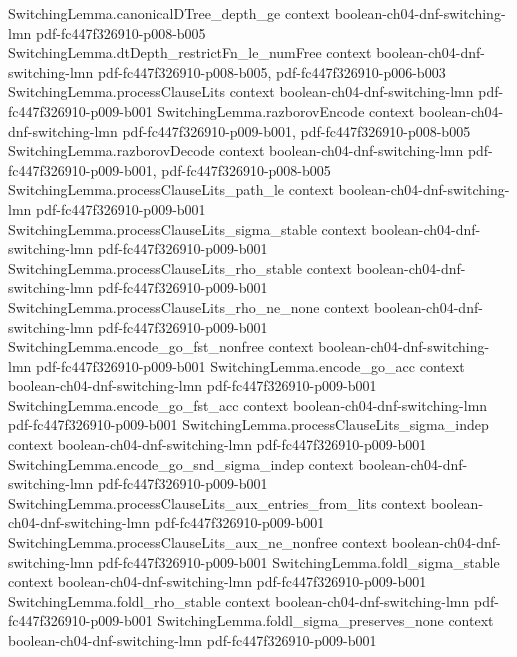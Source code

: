 \begin{theorem}
\proofstep
  {SwitchingLemma.canonicalDTree_depth_ge}
  {context}
  {boolean-ch04-dnf-switching-lmn}
  {pdf-fc447f326910-p008-b005}
\proofstep
  {SwitchingLemma.dtDepth_restrictFn_le_numFree}
  {context}
  {boolean-ch04-dnf-switching-lmn}
  {pdf-fc447f326910-p008-b005,
    pdf-fc447f326910-p006-b003}
\proofstep
  {SwitchingLemma.processClauseLits}
  {context}
  {boolean-ch04-dnf-switching-lmn}
  {pdf-fc447f326910-p009-b001}
\proofstep
  {SwitchingLemma.razborovEncode}
  {context}
  {boolean-ch04-dnf-switching-lmn}
  {pdf-fc447f326910-p009-b001,
    pdf-fc447f326910-p008-b005}
\proofstep
  {SwitchingLemma.razborovDecode}
  {context}
  {boolean-ch04-dnf-switching-lmn}
  {pdf-fc447f326910-p009-b001,
    pdf-fc447f326910-p008-b005}
\proofstep
  {SwitchingLemma.processClauseLits_path_le}
  {context}
  {boolean-ch04-dnf-switching-lmn}
  {pdf-fc447f326910-p009-b001}
\proofstep
  {SwitchingLemma.processClauseLits_sigma_stable}
  {context}
  {boolean-ch04-dnf-switching-lmn}
  {pdf-fc447f326910-p009-b001}
\proofstep
  {SwitchingLemma.processClauseLits_rho_stable}
  {context}
  {boolean-ch04-dnf-switching-lmn}
  {pdf-fc447f326910-p009-b001}
\proofstep
  {SwitchingLemma.processClauseLits_rho_ne_none}
  {context}
  {boolean-ch04-dnf-switching-lmn}
  {pdf-fc447f326910-p009-b001}
\proofstep
  {SwitchingLemma.encode_go_fst_nonfree}
  {context}
  {boolean-ch04-dnf-switching-lmn}
  {pdf-fc447f326910-p009-b001}
\proofstep
  {SwitchingLemma.encode_go_acc}
  {context}
  {boolean-ch04-dnf-switching-lmn}
  {pdf-fc447f326910-p009-b001}
\proofstep
  {SwitchingLemma.encode_go_fst_acc}
  {context}
  {boolean-ch04-dnf-switching-lmn}
  {pdf-fc447f326910-p009-b001}
\proofstep
  {SwitchingLemma.processClauseLits_sigma_indep}
  {context}
  {boolean-ch04-dnf-switching-lmn}
  {pdf-fc447f326910-p009-b001}
\proofstep
  {SwitchingLemma.encode_go_snd_sigma_indep}
  {context}
  {boolean-ch04-dnf-switching-lmn}
  {pdf-fc447f326910-p009-b001}
\proofstep
  {SwitchingLemma.processClauseLits_aux_entries_from_lits}
  {context}
  {boolean-ch04-dnf-switching-lmn}
  {pdf-fc447f326910-p009-b001}
\proofstep
  {SwitchingLemma.processClauseLits_aux_ne_nonfree}
  {context}
  {boolean-ch04-dnf-switching-lmn}
  {pdf-fc447f326910-p009-b001}
\proofstep
  {SwitchingLemma.foldl_sigma_stable}
  {context}
  {boolean-ch04-dnf-switching-lmn}
  {pdf-fc447f326910-p009-b001}
\proofstep
  {SwitchingLemma.foldl_rho_stable}
  {context}
  {boolean-ch04-dnf-switching-lmn}
  {pdf-fc447f326910-p009-b001}
\proofstep
  {SwitchingLemma.foldl_sigma_preserves_none}
  {context}
  {boolean-ch04-dnf-switching-lmn}
  {pdf-fc447f326910-p009-b001}

\end{theorem}
